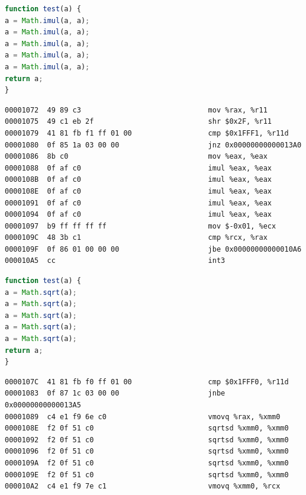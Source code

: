 \documentclass[11pt,
  titlepage=false,
  parskip=half,      %
]{scrreprt}
\begin{document}
\begin{lstlisting}[float,caption={A test function for the \texttt{imul} instruction},label={lst:testimul},language=JavaScript]
function test(a) {
a = Math.imul(a, a);
a = Math.imul(a, a);
a = Math.imul(a, a);
a = Math.imul(a, a);
a = Math.imul(a, a);
return a;
}
\end{lstlisting}

\begin{lstlisting}[float,caption={The compiled result of the \texttt{imul} test function},label={lst:compileimul}]
00001072  49 89 c3                              mov %rax, %r11
00001075  49 c1 eb 2f                           shr $0x2F, %r11
00001079  41 81 fb f1 ff 01 00                  cmp $0x1FFF1, %r11d
00001080  0f 85 1a 03 00 00                     jnz 0x00000000000013A0
00001086  8b c0                                 mov %eax, %eax
00001088  0f af c0                              imul %eax, %eax
0000108B  0f af c0                              imul %eax, %eax
0000108E  0f af c0                              imul %eax, %eax
00001091  0f af c0                              imul %eax, %eax
00001094  0f af c0                              imul %eax, %eax
00001097  b9 ff ff ff ff                        mov $-0x01, %ecx
0000109C  48 3b c1                              cmp %rcx, %rax
0000109F  0f 86 01 00 00 00                     jbe 0x00000000000010A6
000010A5  cc                                    int3
\end{lstlisting}

\begin{lstlisting}[float,caption={A test function for the \texttt{sqrt} instruction},label={lst:testsqrt},language=JavaScript]
function test(a) {
a = Math.sqrt(a);
a = Math.sqrt(a);
a = Math.sqrt(a);
a = Math.sqrt(a);
a = Math.sqrt(a);
return a;
}
\end{lstlisting}

\begin{lstlisting}[float,caption={The compiled result of the \texttt{sqrt} test function},label={lst:compilesqrt}]
0000107C  41 81 fb f0 ff 01 00                  cmp $0x1FFF0, %r11d
00001083  0f 87 1c 03 00 00                     jnbe 0x00000000000013A5
00001089  c4 e1 f9 6e c0                        vmovq %rax, %xmm0
0000108E  f2 0f 51 c0                           sqrtsd %xmm0, %xmm0
00001092  f2 0f 51 c0                           sqrtsd %xmm0, %xmm0
00001096  f2 0f 51 c0                           sqrtsd %xmm0, %xmm0
0000109A  f2 0f 51 c0                           sqrtsd %xmm0, %xmm0
0000109E  f2 0f 51 c0                           sqrtsd %xmm0, %xmm0
000010A2  c4 e1 f9 7e c1                        vmovq %xmm0, %rcx
\end{lstlisting}
\end{document}
